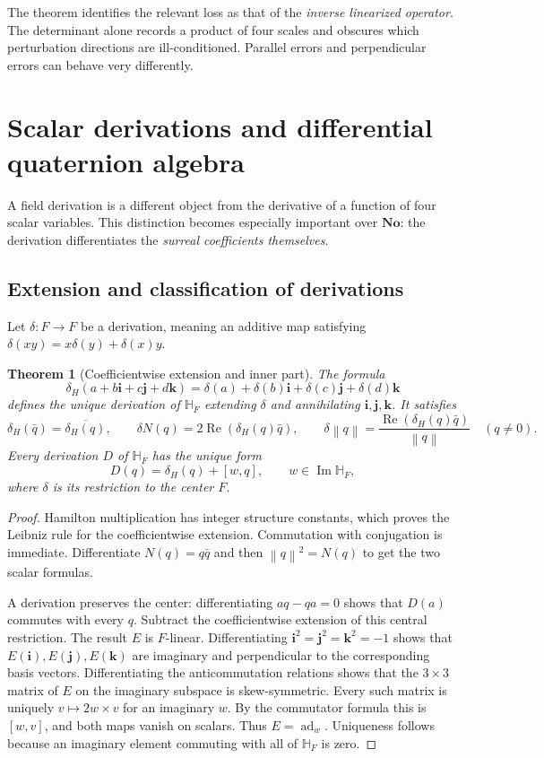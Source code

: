 \documentclass[11pt,letterpaper]{article}
\newtheorem{theorem}{Theorem}[section]
\theoremstyle{definition}
\newcommand{\No}{\mathbf{No}}
\newcommand{\HF}{\mathbb H_F}
\newcommand{\ii}{\mathbf i}
\newcommand{\jj}{\mathbf j}
\newcommand{\kk}{\mathbf k}
\newcommand{\norm}[1]{\left\lVert#1\right\rVert}
\DeclareMathOperator{\Rea}{Re}
\DeclareMathOperator{\Imag}{Im}
\DeclareMathOperator{\ad}{ad}
\begin{document}
The theorem identifies the relevant loss as that of the \emph{inverse
linearized operator}. The determinant alone records a product of four scales
and obscures which perturbation directions are ill-conditioned. Parallel
errors and perpendicular errors can behave very differently.

\section{Scalar derivations and differential quaternion algebra}
\label{sec:derivations}
A field derivation is a different object from the derivative of a function of
four scalar variables. This distinction becomes especially important over
$\No$: the derivation differentiates the \emph{surreal coefficients themselves}.

\subsection{Extension and classification of derivations}
Let $\delta:F\to F$ be a derivation, meaning an additive map satisfying
$\delta(xy)=x\delta(y)+\delta(x)y$.

\begin{theorem}[Coefficientwise extension and inner part]
\label{thm:derivations}
The formula
\[
 \delta_H(a+b\ii+c\jj+d\kk)
 =\delta(a)+\delta(b)\ii+\delta(c)\jj+\delta(d)\kk
\]
defines the unique derivation of $\HF$ extending $\delta$ and annihilating
$\ii,\jj,\kk$. It satisfies
\[
 \delta_H(\bar q)=\overline{\delta_H(q)},\qquad
 \delta N(q)=2\Rea(\delta_H(q)\bar q),
 \qquad
 \delta\norm{q}=\frac{\Rea(\delta_H(q)\bar q)}{\norm{q}}\quad(q\ne0).
\]
Every derivation $D$ of $\HF$ has the unique form
\begin{equation}
 D(q)=\delta_H(q)+[w,q],\qquad w\in\Imag\HF,
 \label{eq:derivation-decomp}
\end{equation}
where $\delta$ is its restriction to the center $F$.
\end{theorem}
\begin{proof}
Hamilton multiplication has integer structure constants, which proves the
Leibniz rule for the coefficientwise extension. Commutation with conjugation
is immediate. Differentiate $N(q)=q\bar q$ and then $\norm{q}^2=N(q)$ to get
the two scalar formulas.

A derivation preserves the center: differentiating $aq-qa=0$ shows that
$D(a)$ commutes with every $q$. Subtract the coefficientwise extension of this
central restriction. The result $E$ is $F$-linear. Differentiating
$\ii^2=\jj^2=\kk^2=-1$ shows that $E(\ii),E(\jj),E(\kk)$ are imaginary
and perpendicular to the corresponding basis vectors. Differentiating the
anticommutation relations shows that the $3\times3$ matrix of $E$ on the
imaginary subspace is skew-symmetric. Every such matrix is uniquely
$v\mapsto2w\times v$ for an imaginary $w$. By the commutator formula this
is $[w,v]$, and both maps vanish on scalars. Thus $E=\ad_w$. Uniqueness follows
because an imaginary element commuting with all of $\HF$ is zero.
\end{proof}
\end{document}
